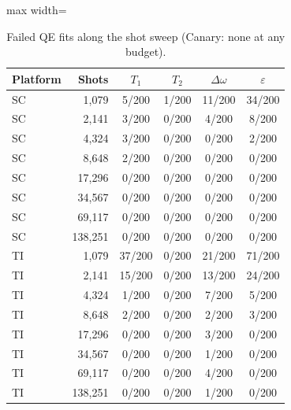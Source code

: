 \begin{table}[!t]
\centering
\footnotesize
\caption{Failed QE fits along the shot sweep (Canary: none at any budget).}
\label{tab:s5}
\begin{adjustbox}{max width=\linewidth}
\begin{tabular}{lrcccc}
\hline
Platform & Shots & $T_1$ & $T_2$ & $\Delta\omega$ & $\varepsilon$ \\
\hline
SC & 1,079 & 5/200 & 1/200 & 11/200 & 34/200 \\
SC & 2,141 & 3/200 & 0/200 & 4/200 & 8/200 \\
SC & 4,324 & 3/200 & 0/200 & 0/200 & 2/200 \\
SC & 8,648 & 2/200 & 0/200 & 0/200 & 0/200 \\
SC & 17,296 & 0/200 & 0/200 & 0/200 & 0/200 \\
SC & 34,567 & 0/200 & 0/200 & 0/200 & 0/200 \\
SC & 69,117 & 0/200 & 0/200 & 0/200 & 0/200 \\
SC & 138,251 & 0/200 & 0/200 & 0/200 & 0/200 \\
\hline
TI & 1,079 & 37/200 & 0/200 & 21/200 & 71/200 \\
TI & 2,141 & 15/200 & 0/200 & 13/200 & 24/200 \\
TI & 4,324 & 1/200 & 0/200 & 7/200 & 5/200 \\
TI & 8,648 & 2/200 & 0/200 & 2/200 & 3/200 \\
TI & 17,296 & 0/200 & 0/200 & 3/200 & 0/200 \\
TI & 34,567 & 0/200 & 0/200 & 1/200 & 0/200 \\
TI & 69,117 & 0/200 & 0/200 & 4/200 & 0/200 \\
TI & 138,251 & 0/200 & 0/200 & 1/200 & 0/200 \\
\hline
\end{tabular}
\end{adjustbox}
\end{table}

